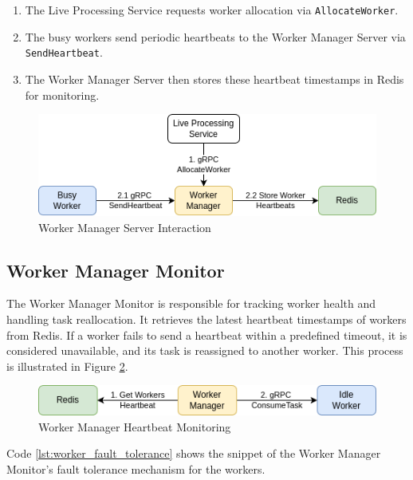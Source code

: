 \begin{enumerate}
  \item [1] The Live Processing Service requests worker allocation via \texttt{AllocateWorker}.
  \item [2.1] The busy workers send periodic heartbeats to the Worker Manager Server via \texttt{SendHeartbeat}.
  \item [2.2] The Worker Manager Server then stores these heartbeat timestamps in Redis for monitoring.
\end{enumerate}

\begin{figure}[H]
  \centering
  \includegraphics[width=.8\textwidth]{figures/worker_manager_server.drawio.png}
  \caption{Worker Manager Server Interaction}
  \label{fig:worker_manager_server}
\end{figure}


\subsection{Worker Manager Monitor} \label{subsection:worker_manager_monitor}
The Worker Manager Monitor is responsible for tracking worker health and handling task reallocation. It retrieves the latest heartbeat timestamps of workers from Redis. If a worker fails to send a heartbeat within a predefined timeout, it is considered unavailable, and its task is reassigned to another worker. This process is illustrated in Figure \ref{fig:worker_manager_monitor}.
\begin{figure}[ht]
  \centering
  \includegraphics[width=.8\textwidth]{figures/worker_manager_heartbeat.drawio.png}
  \caption{Worker Manager Heartbeat Monitoring}
  \label{fig:worker_manager_monitor}
\end{figure}

Code \ref{lst:worker_fault_tolerance} shows the snippet of the Worker Manager Monitor's fault tolerance mechanism for the workers.

